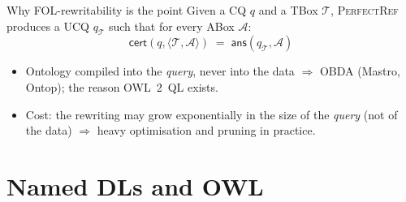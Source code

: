 \documentclass[10pt,aspectratio=169,xcolor=table]{beamer}
\begin{document}
\begin{frame}{Why FOL-rewritability is the point}
  Given a CQ $q$ and a TBox $\mathcal{T}$, \textsc{PerfectRef} produces a UCQ
  $q_{\mathcal{T}}$ such that for every ABox $\mathcal{A}$:
  \[
    \mathsf{cert}(q, \langle \mathcal{T}, \mathcal{A}\rangle)
    \;=\;
    \mathsf{ans}(q_{\mathcal{T}}, \mathcal{A})
  \]
  \begin{center}
  \end{center}
  \begin{itemize}
    \item Ontology compiled into the \emph{query}, never into the data
      $\Rightarrow$ OBDA (Mastro, Ontop); the reason OWL~2~QL exists.
    \item Cost: the rewriting may grow exponentially in the size of the \emph{query}
      (not of the data) $\Rightarrow$ heavy optimisation and pruning in practice.
  \end{itemize}
\end{frame}

\section{Named DLs and OWL}
\end{document}
